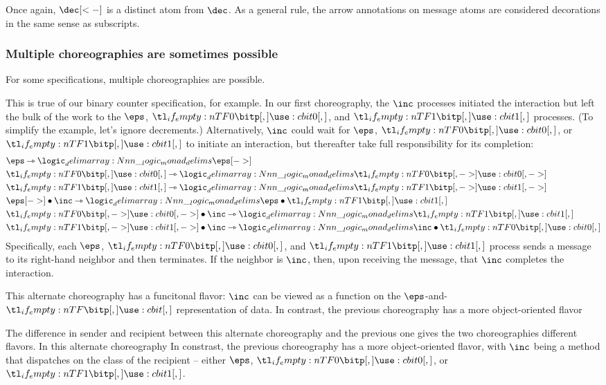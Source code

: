 Once again, $\dec[<-]$ is a distinct atom from $\dec$.
As a general rule, the arrow annotations on message atoms are considered decorations in the same sense as subscripts.

\subsubsection{Multiple choreographies are sometimes possible}\label{sec:mult-chor-are}

For some specifications, multiple choreographies are possible.

This is true of our binary counter specification, for example.
%
In our first choreography,
the $\inc$ processes initiated the interaction but left the bulk of the work to the $\eps$, $\bit{0}$, and $\bit{1}$ processes.
(To simplify the example, let's ignore decrements.)
Alternatively, $\inc$ could wait for $\eps$, $\bit{0}$, or $\bit{1}$ to initiate an interaction, but thereafter take full responsibility for its completion:
\begin{align*}
  &\eps \lrimp \monad{\eps[->]} \\
  &\bit{0} \lrimp \monad{\bit{0}[->]} \\
  &\bit{1} \lrimp \monad{\bit{1}[->]} \\
  &\eps[->] \fuse \inc \lrimp \monad{\eps \fuse \bit{1}} \\
  &\bit{0}[->] \fuse \inc \lrimp \monad{\bit{1}} \\
  &\bit{1}[->] \fuse \inc \lrimp \monad{\inc \fuse \bit{0}}
\end{align*}
Specifically, each $\eps$, $\bit{0}$, and $\bit{1}$ process sends a message to its right-hand neighbor and then terminates.
If the neighbor is $\inc$, then, upon receiving the message, that $\inc$ completes the interaction.

This alternate choreography has a funcitonal flavor: $\inc$ can be viewed as a function on the $\eps$-and-$\bit{}$ representation of data.
In contrast, the previous choreography has a more object-oriented flavor

The difference in sender and recipient between this alternate choreography and the previous one gives the two choreographies different flavors.
In this alternate choreography
In constrast, the previous choreography has a more object-oriented flavor, with $\inc$ being a method that dispatches on the class of the recipient -- either $\eps$, $\bit{0}$, or $\bit{1}$.

